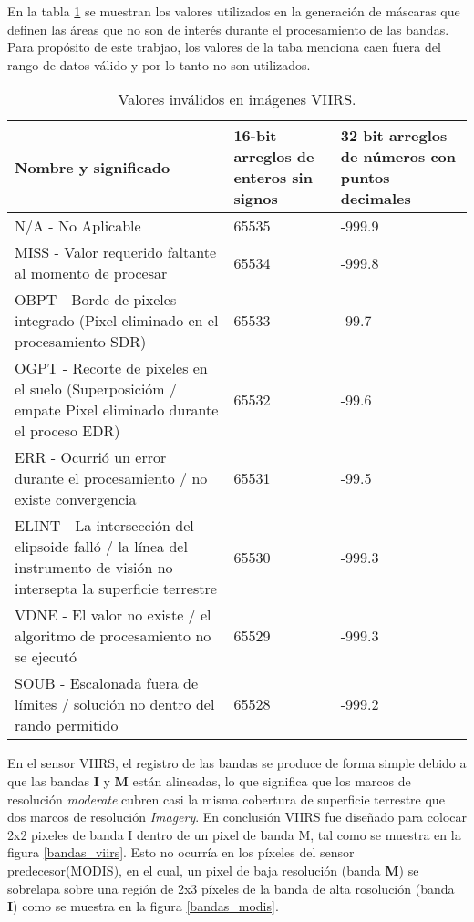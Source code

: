 En la tabla \ref{invalid_values} se muestran los valores utilizados en la generación de máscaras que definen las áreas que no son de interés durante el procesamiento de las bandas. Para propósito de este trabjao, los valores de la taba menciona caen fuera del rango de datos válido y por lo tanto no son utilizados.  

\begin{table}[ht!]

\begin{center}
\begin{tabular}{| p{6cm} | p{2.5cm} | p{2.5cm} |}
\hline
Nombre y significado & 16-bit arreglos de enteros sin signos & 32 bit arreglos de números con puntos decimales \\
\hline
N/A - No Aplicable & 65535 & -999.9 \\
\hline
MISS - Valor requerido faltante al momento de procesar &  65534 & -999.8\\
\hline
OBPT - Borde de pixeles integrado (Pixel eliminado en el procesamiento SDR) & 65533 &-99.7\\
\hline
OGPT - Recorte de pixeles en el suelo (Superposicióm / empate Pixel eliminado durante el proceso EDR) & 65532 & -99.6 \\
\hline
ERR - Ocurrió un error durante el procesamiento / no existe convergencia & 65531 & -99.5 \\
\hline
ELINT - La intersección del elipsoide falló / la línea del instrumento de visión no intersepta la superficie terrestre & 65530 & -999.3 \\
\hline
VDNE - El valor no existe / el algoritmo de procesamiento no se ejecutó & 65529 & -999.3 \\
\hline
SOUB - Escalonada fuera de límites / solución no dentro del rando permitido & 65528 & -999.2 \\
\hline

\end{tabular}
\end{center}
\caption{Valores inválidos en imágenes VIIRS.} \label{invalid_values}

\end{table}


En el sensor VIIRS, el registro de las bandas se produce de forma simple debido a que las bandas \textbf{I} y \textbf{M} están alineadas, lo que significa que los marcos de resolución \textit{moderate} cubren casi la misma cobertura de superficie terrestre que dos marcos de resolución \textit{Imagery}. En conclusión VIIRS fue diseñado para colocar 2x2 pixeles de banda I dentro de un pixel de banda M, tal como se muestra en la figura \ref{bandas_viirs}. Esto no ocurría en los píxeles del sensor predecesor(MODIS), en el cual, un pixel de baja resolución (banda \textbf{M}) se sobrelapa sobre una región de 2x3 píxeles de la banda de alta rosolución (banda \textbf{I}) como se muestra en la figura \ref{bandas_modis}.

